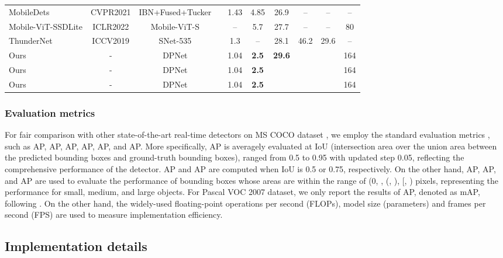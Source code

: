 \documentclass[lettersize,journal]{IEEEtran}
\begin{document}
\begin{table*}[t!]
\begin{center}
\begin{tabular}{l|c|c|c|c|c|c|c|c|c}
			MobileDets \cite{xiong2021mobiledets}&CVPR2021 & IBN+Fused+Tucker  &&1.43 & 4.85 &26.9&--&-- &-- \\
			Mobile-ViT-SSDLite \cite{mehta2021mobilevit}&ICLR2022	 &Mobile-ViT-S &  &--&5.7&27.7&--&--&80\\
			ThunderNet \cite{qin2019thundernet}&ICCV2019&SNet-535&&1.3 & -- &28.1 &46.2&29.6 & --\\			
\midrule
			Ours &- &DPNet&&1.04 & \textbf{2.5} &  \textbf{29.6} &  & & 164\\
			Ours &- &DPNet&&1.04 & \textbf{2.5} &   &  & & 164\\
			Ours &- &DPNet&&1.04 & \textbf{2.5} &   &  & & 164\\
\bottomrule
	\end{tabular}
	\end{center}\label{tab:det_result}
\end{table*}


\subsubsection{Evaluation metrics}

For fair comparison with other state-of-the-art real-time detectors on MS COCO dataset \cite{lin2014microsoft}, we employ the standard evaluation metrics \cite{lin2017focal,redmon2018yolov3,wang2021scaled}, such as AP, AP, AP, AP, AP, and AP. More specifically, AP is averagely evaluated at IoU (intersection area over the union area between the predicted bounding boxes and ground-truth bounding boxes), ranged from 0.5 to 0.95 with updated step 0.05, reflecting the comprehensive performance of the detector. AP and AP are computed when IoU is 0.5 or 0.75, respectively. On the other hand, AP, AP, and AP are used to evaluate the performance of bounding boxes whose areas are within the range of (0, , (, ), [, ) pixels, representing the performance for small, medium, and large objects. For Pascal VOC 2007 \cite{everingham2010pascal} dataset, we only report the results of AP, denoted as mAP, following \cite{qin2019thundernet,shen2019object}. On the other hand, the widely-used floating-point operations per second (FLOPs), model size (parameters) and frames per second (FPS) are used to measure implementation efficiency.

\subsection{Implementation details}\label{sec:settings}
\end{document}

